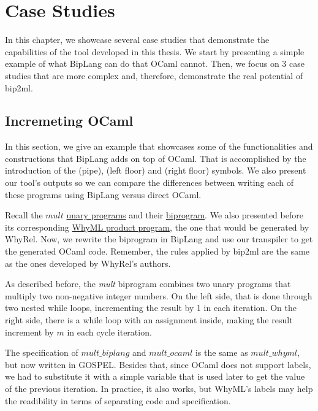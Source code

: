 
%

\chapter{Case Studies}
\label{cha:case_studies}

In this chapter, we showcase several case studies that demonstrate the capabilities of the tool developed in this thesis.
We start by presenting a simple example of what BipLang can do that OCaml cannot.
Then, we focus on 3 case studies that are more complex and, therefore, demonstrate the real potential of bip2ml.


\section{Incremeting OCaml}
\label{sec:incrementing}

In this section, we give an example that showcases some of the functionalities and constructions that BipLang adds on top of OCaml.
That is accomplished by the introduction of the \bm{$\langle|\rangle$} (pipe), \bm{$\lfloor$} (left floor) and \bm{$\rfloor$} (right floor) symbols.
We also present our tool's outputs so we can compare the differences between writing each of these programs using BipLang versus direct OCaml.

Recall the $mult$ \hyperref[fig:mult_source_programs]{unary programs} and their \hyperref[fig:mult_biprogram]{biprogram}.
We also presented before its corresponding \hyperref[fig:translation_ex]{WhyML product program}, the one that would be generated by WhyRel.
Now, we rewrite the biprogram in BipLang and use our transpiler to get the generated OCaml code.
Remember, the rules applied by bip2ml are the same as the ones developed by WhyRel's authors.

As described before, the \emph{mult} biprogram combines two unary programs that multiply two non-negative integer numbers.
On the left side, that is done through two nested while loops, incrementing the result by 1 in each iteration.
On the right side, there is a while loop with an assignment inside, making the result increment by $m$ in each cycle iteration.

The specification of $mult\_biplang$ and $mult\_ocaml$ is the same as $mult\_whyml$, but now written in GOSPEL.
Besides that, since OCaml does not support labels, we had to substitute it with a simple variable that is used later to get the value of the previous iteration.
In practice, it also works, but WhyML's labels may help the readibility in terms of separating code and specification.

